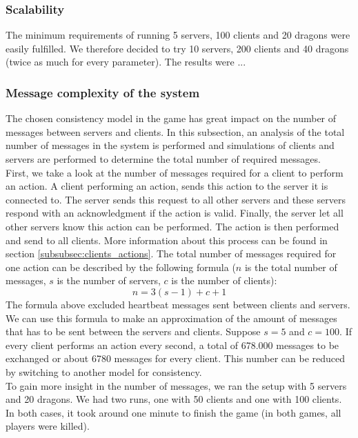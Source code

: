 	\subsubsection{Scalability}
	\label{subsubsec:scalability}
		The minimum requirements of running 5 servers, 100 clients and 20 dragons were easily fulfilled. We therefore decided to try 10 servers, 200 clients and 40 dragons (twice as much for every parameter). The results were ...
		
	\subsubsection{Message complexity of the system}
	\label{subsubsec:nummessages}
		The chosen consistency model in the game has great impact on the number of messages between servers and clients. 
		In this subsection, an analysis of the total number of messages in the system is performed and simulations of clients and servers are performed to determine the total number of required messages.\\
		First, we take a look at the number of messages required for a client to perform an action. 
		A client performing an action, sends this action to the server it is connected to. 
		The server sends this request to all other servers and these servers respond with an acknowledgment if the action is valid. 
		Finally, the server let all other servers know this action can be performed. 
		The action is then performed and send to all clients. 
		More information about this process can be found in section \ref{subsubsec:clients_actions}. 
		The total number of messages required for one action can be described by the following formula ($ n $ is the total number of messages, $ s $ is the number of servers, $ c $ is the number of clients):
		$$ n = 3(s - 1) + c + 1 $$
		The formula above excluded heartbeat messages sent between clients and servers.
		We can use this formula to make an approximation of the amount of messages that has to be sent between the servers and clients. 
		Suppose $ s = 5 $ and $ c = 100 $. 
		If every client performs an action every second, a total of 678.000 messages to be exchanged or about 6780 messages for every client. 
		This number can be reduced by switching to another model for consistency.\\
		To gain more insight in the number of messages, we ran the setup with 5 servers and 20 dragons. 
		We had two runs, one with 50 clients and one with 100 clients. 
		In both cases, it took around one minute to finish the game (in both games, all players were killed). 
